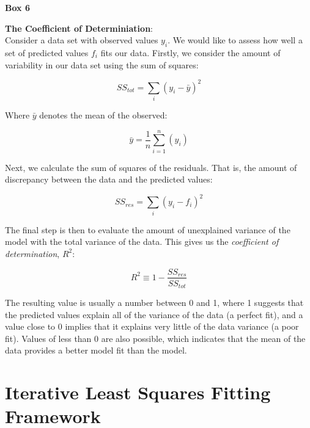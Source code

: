 \newpage
\begin{framed}
{\begin{center}{\bf Box 6}\end{center}}
{\bf The Coefficient of Determiniation}:\\

Consider a data set with observed values $y_i$. We would like to assess how
well a set of predicted values $f_i$ fits our data. Firstly, we
consider the amount of variability in our data set using the sum of
squares:

\begin{equation}
  SS_{tot} = \sum\limits_{i}(y_i - \bar{y})^2
\end{equation}

Where $\bar{y}$ denotes the mean of the observed:

\begin{equation}
  \bar{y} = \frac{1}{n}\sum\limits_{i=1}^n(y_i)
\end{equation}

Next, we calculate the sum of squares of the residuals. That is, the
amount of discrepancy between the data and the predicted values:

\begin{equation}
SS_{res} = \sum\limits_{i}(y_i - f_i)^2
\end{equation}

The final step is then to evaluate the amount of unexplained variance of
the model with the total variance of the data. This gives us the
\emph{coefficient of determination}, $R^2$:

\begin{equation}
  R^2 \equiv 1 - \frac{SS_{res}}{SS_{tot}}
\end{equation}

The resulting value is usually a number between 0 and 1, where 1
suggests that the predicted values explain all of the variance of the
data (a perfect fit), and a value close to 0 implies that it explains
very little of the data
variance (a poor fit). Values of less than 0 are also possible, which indicates
that the mean of the data provides a better model fit than the model.

\end{framed}

\section{Iterative Least Squares Fitting Framework}
